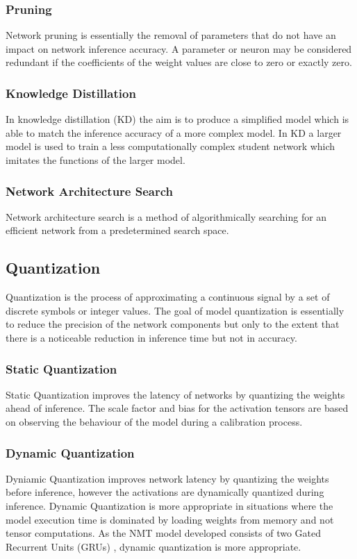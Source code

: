 \documentclass{sigchi}
\begin{document}
\subsubsection{Pruning}
Network pruning is essentially the removal of parameters that do not have an impact on network inference accuracy. \cite{pruningandquant} A parameter or neuron may be considered redundant if the coefficients of the weight values are close to zero or exactly zero.

\subsubsection{Knowledge Distillation}
In knowledge distillation (KD) the aim is to produce a simplified model which is able to match the inference accuracy of a more complex model. In KD a larger model is used to train a less computationally complex student network which imitates the functions of the larger model. \cite{pruningandquant}

\subsubsection{Network Architecture Search}
Network architecture search is a method of algorithmically searching for an efficient network from a predetermined search space. 

\subsection{Quantization}
Quantization is the process of approximating a continuous signal by a set of discrete symbols or integer values. \cite{pruningandquant} The goal of model quantization is essentially to reduce the precision of the network components but only to the extent that there is a noticeable reduction in inference time but not in accuracy. 

\subsubsection{Static Quantization}
Static Quantization improves the latency of networks by quantizing the weights ahead of inference. The scale factor and bias for the activation tensors are based on observing the behaviour of the model during a calibration process.

\subsubsection{Dynamic Quantization}
Dyniamic Quantization improves network latency by quantizing the weights before inference, however the activations are dynamically quantized during inference. Dynamic Quantization is more appropriate in situations where the model execution time is dominated by loading weights from memory and not tensor computations. As the NMT model developed consists of two Gated Recurrent Units (GRUs) \cite{gru}, dynamic quantization is more appropriate.
\end{document}
